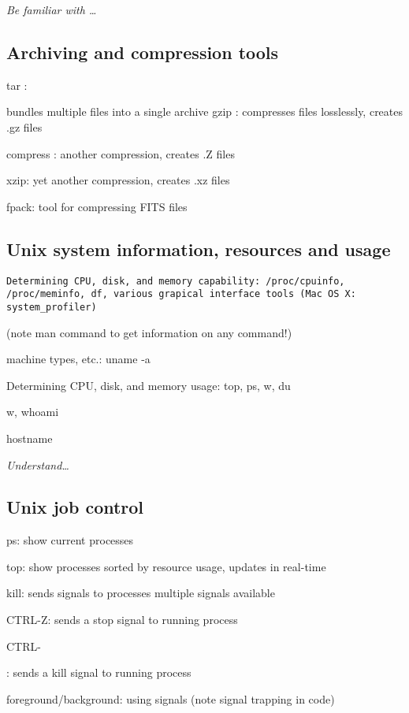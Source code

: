 \documentclass{article}
\newcommand{\test}[1]{%
    \begin{center}
        \colorbox{hl}{\parbox{0.9\textwidth}{\emph{#1}}}
    \end{center}}
\begin{document}
\test{Be familiar with \ldots}

\subsection{Archiving and compression tools}

tar :

bundles multiple files into a single archive
gzip : compresses files losslessly, creates .gz files

compress : another compression, creates .Z files

xzip: yet another compression, creates .xz files

fpack: tool for compressing FITS files

\subsection{Unix system information, resources and usage}
\begin{verbatim}
Determining CPU, disk, and memory capability: /proc/cpuinfo,
/proc/meminfo, df, various grapical interface tools (Mac OS X:
system_profiler)
\end{verbatim}

(note man command to get information on any command!)

machine types, etc.: uname -a

Determining CPU, disk, and memory usage: top, ps, w, du

w, whoami

hostname

\test{Understand\ldots}

\subsection{Unix job control}
ps: show current processes

top: show processes sorted by resource usage, updates in real-time

kill: sends signals to processes multiple signals available

CTRL-Z: sends a stop signal to running process

CTRL-

: sends a kill signal to running process

foreground/background: using signals (note signal trapping in code)
\end{document}
